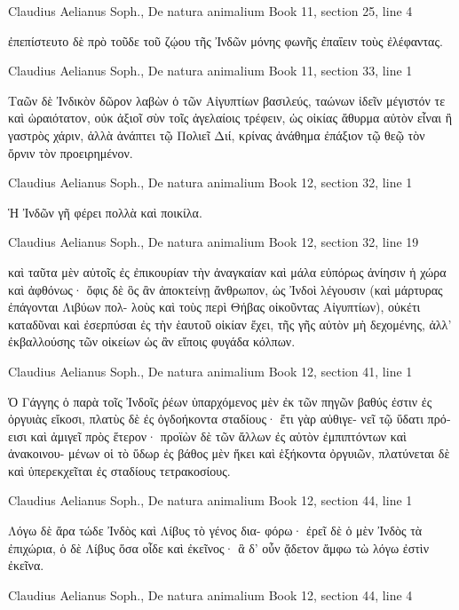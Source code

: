 \documentclass[12pt,letterpaper,twoside,final]{memoir}
\begin{document}
\begin{greek}
Claudius Aelianus Soph., De natura animalium 
Book 11, section 25, line 4

ἐπεπίστευτο δὲ πρὸ τοῦδε τοῦ ζῴου τῆς Ἰνδῶν μόνης 
φωνῆς ἐπαΐειν τοὺς ἐλέφαντας. 



Claudius Aelianus Soph., De natura animalium 
Book 11, section 33, line 1

Ταῶν δὲ Ἰνδικὸν δῶρον λαβὼν ὁ τῶν Αἰγυπτίων 
βασιλεύς, ταώνων ἰδεῖν μέγιστόν τε καὶ ὡραιότατον, 
οὐκ ἀξιοῖ σὺν τοῖς ἀγελαίοις τρέφειν, ὡς οἰκίας 
ἄθυρμα αὐτὸν εἶναι ἢ γαστρὸς χάριν, ἀλλὰ ἀνάπτει 
τῷ Πολιεῖ Διί, κρίνας ἀνάθημα ἐπάξιον τῷ 
θεῷ τὸν ὄρνιν τὸν προειρημένον. 



Claudius Aelianus Soph., De natura animalium 
Book 12, section 32, line 1

Ἡ Ἰνδῶν γῆ φέρει πολλὰ καὶ ποικίλα. 



Claudius Aelianus Soph., De natura animalium 
Book 12, section 32, line 19

      καὶ ταῦτα μὲν αὐτοῖς ἐς ἐπικουρίαν τὴν 
ἀναγκαίαν καὶ μάλα εὐπόρως ἀνίησιν ἡ χώρα καὶ 
ἀφθόνως· ὄφις δὲ ὃς ἂν ἀποκτείνῃ ἄνθρωπον, ὡς 
Ἰνδοὶ λέγουσιν (καὶ μάρτυρας ἐπάγονται Λιβύων πολ-
λοὺς καὶ τοὺς περὶ Θήβας οἰκοῦντας Αἰγυπτίων), 
οὐκέτι καταδῦναι καὶ ἐσερπύσαι ἐς τὴν ἑαυτοῦ οἰκίαν 
ἔχει, τῆς γῆς αὐτὸν μὴ δεχομένης, ἀλλ' ἐκβαλλούσης 
τῶν οἰκείων ὡς ἂν εἴποις φυγάδα κόλπων. 



Claudius Aelianus Soph., De natura animalium 
Book 12, section 41, line 1

Ὁ Γάγγης ὁ παρὰ τοῖς Ἰνδοῖς ῥέων ὑπαρχόμενος 
μὲν ἐκ τῶν πηγῶν βαθύς ἐστιν ἐς ὀργυιὰς εἴκοσι, 
πλατὺς δὲ ἐς ὀγδοήκοντα σταδίους· ἔτι γὰρ αὐθιγε-
νεῖ τῷ ὕδατι πρόεισι καὶ ἀμιγεῖ πρὸς ἕτερον· προϊὼν 
δὲ τῶν ἄλλων ἐς αὐτὸν ἐμπιπτόντων καὶ ἀνακοινου-
μένων οἱ τὸ ὕδωρ ἐς βάθος μὲν ἥκει καὶ ἑξήκοντα 
ὀργυιῶν, πλατύνεται δὲ καὶ ὑπερεκχεῖται ἐς σταδίους 
τετρακοσίους. 



Claudius Aelianus Soph., De natura animalium 
Book 12, section 44, line 1

Λόγω δὲ ἄρα τώδε Ἰνδὸς καὶ Λίβυς τὸ γένος δια-
φόρω· ἐρεῖ δὲ ὁ μὲν Ἰνδὸς τὰ ἐπιχώρια, ὁ δὲ Λίβυς 
ὅσα οἶδε καὶ ἐκεῖνος· ἃ δ' οὖν ᾄδετον ἄμφω τὼ λόγω 
ἐστὶν ἐκεῖνα. 



Claudius Aelianus Soph., De natura animalium 
Book 12, section 44, line 4


\end{greek}
\end{document}
